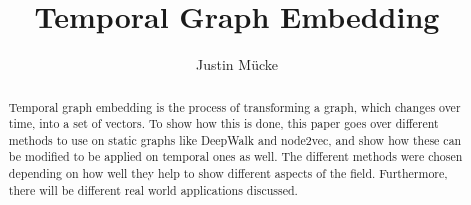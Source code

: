 \documentclass[sigconf]{acmart}
\begin{document}
\title{Temporal Graph Embedding}

\author{Justin Mücke}



\renewcommand{\shortauthors}{Justin Mücke}

\begin{abstract}
 Temporal graph embedding is the process of transforming a graph, which changes over time, into a set of vectors. 
 To show how this is done, this paper goes over different methods to use on static graphs like DeepWalk and node2vec, and show how these can be modified to be applied on temporal ones as well. 
 The different methods were chosen depending on how well they help to show different aspects of the field.
 Furthermore, there will be different real world applications discussed.
\end{abstract}





\maketitle
\end{document}
